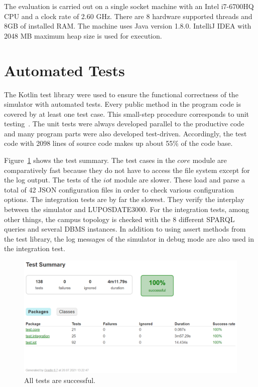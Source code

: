 \documentclass[english,version-2019-11]{uzl-thesis}
\begin{document}
The evaluation is carried out on a single socket machine with an Intel i7-6700HQ CPU and a clock rate of 2.60 GHz. There are 8 hardware supported threads and 8GB of installed RAM. The machine uses Java version 1.8.0. IntelliJ IDEA with 2048 MB maximum heap size is used for execution.
\label{chapter_Evaluation}
\section{Automated Tests}
The Kotlin test library were used to ensure the functional correctness of the simulator with automated tests. Every public method in the program code is covered by at least one test case. This small-step procedure corresponds to unit testing~\cite{BasisTest}. The unit tests were always developed parallel to the productive code and many program parts were also developed test-driven. Accordingly, the test code with 2098 lines of source code makes up about 55\% of the code base.

Figure~\ref{figure_evaluation_testSummary} shows the test summary. The test cases in the $core$ module are comparatively fast because they do not have to access the file system except for the log output. The tests of the $iot$ module are slower. These load and parse a total of 42 JSON configuration files in order to check various configuration options. The integration tests are by far the slowest. They verify the interplay between the simulator and LUPOSDATE3000. For the integration tests, among other things, the campus topology is checked with the 8 different SPARQL queries and several DBMS instances. In addition to using assert methods from the test library, the log messages of the simulator in debug mode are also used in the integration test.
\begin{figure}[htpb]
  \centering
  \includegraphics[scale=0.5]{figure_evaluation_testSummary.pdf}
  \caption{All tests are successful.}
  \label{figure_evaluation_testSummary}
\end{figure}
\end{document}
